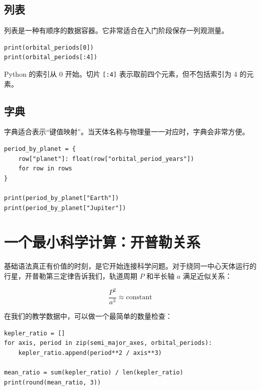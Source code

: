 \subsection{列表}

列表是一种有顺序的数据容器。它非常适合在入门阶段保存一列观测量。

\begin{examplebox}[索引与切片]
\begin{lstlisting}[style=pythonstyle]
print(orbital_periods[0])
print(orbital_periods[:4])
\end{lstlisting}
\end{examplebox}

Python 的索引从 0 开始。切片 \texttt{[:4]} 表示取前四个元素，但不包括索引为 4 的元素。

\subsection{字典}

字典适合表示“键值映射”。当天体名称与物理量一一对应时，字典会非常方便。

\begin{examplebox}[建立名称到周期的映射]
\begin{lstlisting}[style=pythonstyle]
period_by_planet = {
    row["planet"]: float(row["orbital_period_years"])
    for row in rows
}

print(period_by_planet["Earth"])
print(period_by_planet["Jupiter"])
\end{lstlisting}
\end{examplebox}

\section{一个最小科学计算：开普勒关系}

基础语法真正有价值的时刻，是它开始连接科学问题。对于绕同一中心天体运行的行星，开普勒第三定律告诉我们，轨道周期 $P$ 和半长轴 $a$ 满足近似关系：

\[
\frac{P^2}{a^3} \approx \mathrm{constant}
\]

在我们的教学数据中，可以做一个最简单的数量检查：

\begin{examplebox}[计算 $P^2/a^3$]
\begin{lstlisting}[style=pythonstyle]
kepler_ratio = []
for axis, period in zip(semi_major_axes, orbital_periods):
    kepler_ratio.append(period**2 / axis**3)

mean_ratio = sum(kepler_ratio) / len(kepler_ratio)
print(round(mean_ratio, 3))
\end{lstlisting}
\end{examplebox}

